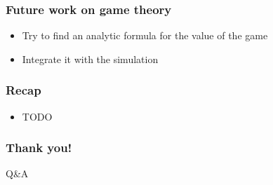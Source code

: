 \documentclass{beamer}
\begin{document}
\begin{frame}
\frametitle{Future work on game theory}
\begin{itemize}
	\item Try to find an analytic formula for the value of the game
	\item Integrate it with the simulation
\end{itemize}
\end{frame}

\begin{frame}
\frametitle{Recap}

\begin{itemize}
	\item TODO
\end{itemize}

\end{frame}


\begin{frame}
\frametitle{Thank you!}

\huge
\centering Q\&A

\end{frame}

\end{document}
